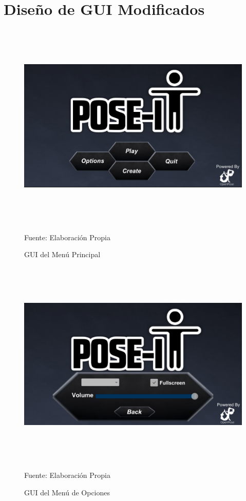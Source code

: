 \clearpage


\clearpage
\section{Diseño de GUI Modificados}



\begin{figure}[h!]
	\centering
	\includegraphics[width=16cm,height=10cm]{./Images/menuprincipal2.png}
	\caption{GUI del Menú Principal}
	\footnotesize Fuente: Elaboración Propia
	\label{gui1}
\end{figure}

\clearpage
\begin{figure}[h]
	\centering
	\includegraphics[width=16cm,height=10cm]{./Images/menu2.png}
	\caption{GUI del Menú de Opciones}
	\footnotesize Fuente: Elaboración Propia
	\label{gui2.5}
\end{figure}

